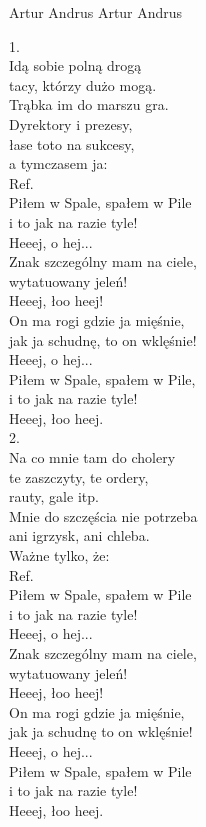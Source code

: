 {Artur Andrus}
{Artur Andrus}
\begin{text}
1.\\
Idą sobie polną drogą\\
tacy, którzy dużo mogą.\\
Trąbka im do marszu gra.\\
Dyrektory i prezesy,\\
łase toto na sukcesy, \\
a tymczasem ja:\\

Ref.\\
Piłem w Spale, spałem w Pile\\
i to jak na razie tyle!\\
Heeej, o hej...\\
Znak szczególny mam na ciele,\\
wytatuowany jeleń!\\
Heeej, łoo heej!\\
On ma rogi gdzie ja mięśnie, \\
jak ja schudnę, to on wklęśnie!\\
Heeej, o hej...\\
Piłem w Spale, spałem w Pile,\\
i to jak na razie tyle!\\
Heeej, łoo heej.\\

2.\\
Na co mnie tam do cholery\\
te zaszczyty, te ordery,\\
rauty, gale itp.\\
Mnie do szczęścia nie potrzeba\\
ani igrzysk, ani chleba.\\
Ważne tylko, że:\\

Ref.\\
Piłem w Spale, spałem w Pile\\
i to jak na razie tyle!\\
Heeej, o hej...\\
Znak szczególny mam na ciele,\\
wytatuowany jeleń!\\
Heeej, łoo heej!\\
On ma rogi gdzie ja mięśnie, \\
jak ja schudnę to on wklęśnie!\\
Heeej, o hej...\\
Piłem w Spale, spałem w Pile\\
i to jak na razie tyle!\\
Heeej, łoo heej.\\


\end{text}
